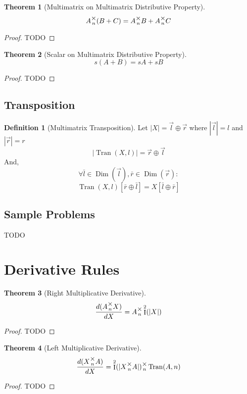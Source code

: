 \documentclass[12pt]{article}
\theoremstyle{definition}
\newtheorem{definition}{Definition}[section]
\newtheorem{theorem}{Theorem}[section]
\theoremstyle{case}
\theoremstyle{ppart}
\DeclareMathOperator{\Dim}{Dim}
\DeclareMathOperator{\Ident}{I}
\DeclareMathOperator{\Tran}{Tran}
\newcommand{\mmult}[1]{\text{\raisebox{1ex}{$\underset{#1}{\times}$}}}
\begin{document}
\begin{theorem}[Multimatrix on Multimatrix Distributive Property]
\[ A \mmult{n} (B + C) = A \mmult{n} B + A \mmult{n} C \]
\end{theorem}
\begin{proof}
TODO
\end{proof}

\begin{theorem}[Scalar on Multimatrix Distributive Property]
\[ s(A + B) = sA + sB \]
\end{theorem}
\begin{proof}
TODO
\end{proof}

\subsection{Transposition}

\begin{definition}[Multimatrix Transposition]
Let $|X| = \vec{l} \oplus \vec{r}$ where $|\vec{l}| = l$ and $|\vec{r}| = r$
\[ |\Tran(X, l)| = \vec{r} \oplus \vec{l} \]
And,
\[ \forall \bar{l} \in \Dim(\vec{l}), \bar{r} \in \Dim(\vec{r}) : \]
\[ \Tran(X, l)[\bar{r} \oplus \bar{l}] = X[\bar{l} \oplus \bar{r}] \]
\end{definition}

\subsection*{Sample Problems}
TODO

\section{Derivative Rules}

\begin{theorem}[Right Multiplicative Derivative]
\[ \frac{d(A \mmult{n} X)}{dX} = A \mmult{n} \Ident^2(|X|) \]
\end{theorem}
\begin{proof}
TODO
\end{proof}

\begin{theorem}[Left Multiplicative Derivative]
\[ \frac{d(X \mmult{n} A)}{dX} = \Ident^2(|X \mmult{n} A|) \mmult{n} \Tran(A, n) \]
\end{theorem}
\begin{proof}
TODO
\end{proof}
\end{document}
